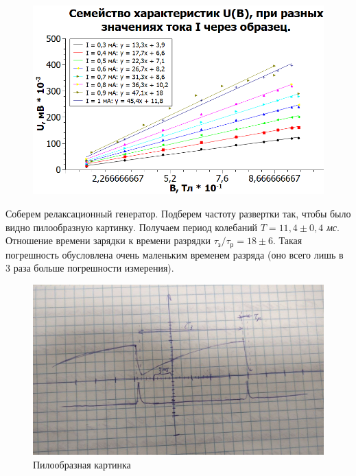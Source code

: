 \documentclass[11pt]{article}
\begin{document}
\begin{figure}[h!]
\centering
\includegraphics[scale=1]{Graph1.png}
\label{fig:Image1}
\end{figure}

\vspace{0.5cm}

Соберем релаксационный генератор. Подберем частоту развертки так, чтобы было видно пилообразную картинку. Получаем период колебаний $T = 11,4 \pm 0,4$ \textit{мс}. Отношение времени зарядки к времени разрядки $\tau_{\textit{з}}/\tau_{\textit{р}} = 18 \pm 6$. Такая погрешность обусловлена очень маленьким временем разряда (оно всего лишь в 3 раза больше погрешности измерения).

\begin{figure}[h!]
\centering
\includegraphics[scale=0.2]{photo1.jpg}
\caption{Пилообразная картинка}
\label{fig:Image1}
\end{figure}

\vspace{0.5cm}
\end{document}
